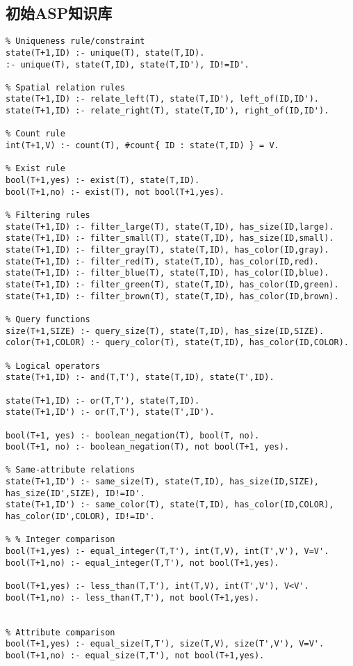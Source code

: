\subsection{初始ASP知识库}
\label{appendix:initial-theory}
\begin{lstlisting}
% Uniqueness rule/constraint
state(T+1,ID) :- unique(T), state(T,ID).
:- unique(T), state(T,ID), state(T,ID'), ID!=ID'.

% Spatial relation rules
state(T+1,ID) :- relate_left(T), state(T,ID'), left_of(ID,ID').
state(T+1,ID) :- relate_right(T), state(T,ID'), right_of(ID,ID').

% Count rule
int(T+1,V) :- count(T), #count{ ID : state(T,ID) } = V.

% Exist rule
bool(T+1,yes) :- exist(T), state(T,ID).
bool(T+1,no) :- exist(T), not bool(T+1,yes).

% Filtering rules
state(T+1,ID) :- filter_large(T), state(T,ID), has_size(ID,large).
state(T+1,ID) :- filter_small(T), state(T,ID), has_size(ID,small).
state(T+1,ID) :- filter_gray(T), state(T,ID), has_color(ID,gray).
state(T+1,ID) :- filter_red(T), state(T,ID), has_color(ID,red).
state(T+1,ID) :- filter_blue(T), state(T,ID), has_color(ID,blue).
state(T+1,ID) :- filter_green(T), state(T,ID), has_color(ID,green).
state(T+1,ID) :- filter_brown(T), state(T,ID), has_color(ID,brown).

% Query functions
size(T+1,SIZE) :- query_size(T), state(T,ID), has_size(ID,SIZE).
color(T+1,COLOR) :- query_color(T), state(T,ID), has_color(ID,COLOR).

% Logical operators
state(T+1,ID) :- and(T,T'), state(T,ID), state(T',ID).

state(T+1,ID) :- or(T,T'), state(T,ID).
state(T+1,ID') :- or(T,T'), state(T',ID').

bool(T+1, yes) :- boolean_negation(T), bool(T, no).
bool(T+1, no) :- boolean_negation(T), not bool(T+1, yes).

% Same-attribute relations
state(T+1,ID') :- same_size(T), state(T,ID), has_size(ID,SIZE), has_size(ID',SIZE), ID!=ID'.
state(T+1,ID') :- same_color(T), state(T,ID), has_color(ID,COLOR), has_color(ID',COLOR), ID!=ID'.

% % Integer comparison
bool(T+1,yes) :- equal_integer(T,T'), int(T,V), int(T',V'), V=V'.
bool(T+1,no) :- equal_integer(T,T'), not bool(T+1,yes).

bool(T+1,yes) :- less_than(T,T'), int(T,V), int(T',V'), V<V'.
bool(T+1,no) :- less_than(T,T'), not bool(T+1,yes).


% Attribute comparison
bool(T+1,yes) :- equal_size(T,T'), size(T,V), size(T',V'), V=V'.
bool(T+1,no) :- equal_size(T,T'), not bool(T+1,yes).


\end{lstlisting}
